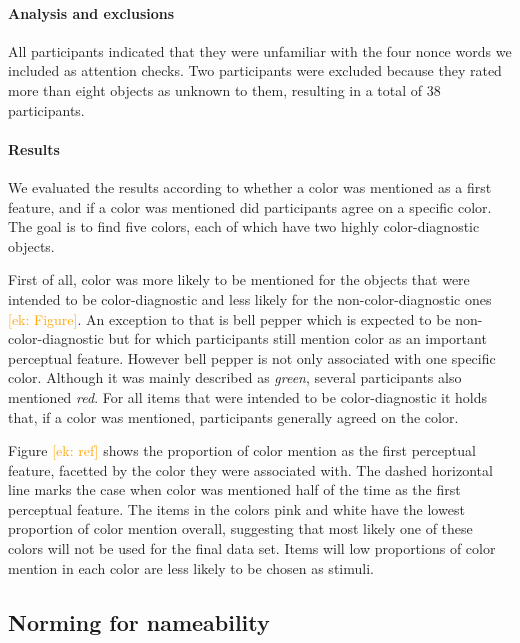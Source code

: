 \documentclass[a4paper,man,floatsintext,natbib,donotrepeattitle]{apa6}
\newcommand{\ek}[1]{\textcolor{Orange}{[ek: #1]}}
\begin{document}
\paragraph{Analysis and exclusions}
All participants indicated that they were unfamiliar with the four nonce words we included as attention checks. Two participants were excluded because they rated more than eight objects as unknown to them, resulting in a total of 38 participants.

\paragraph{Results}
We evaluated the results according to whether a color was mentioned as a first feature, and if a color was mentioned did participants agree on a specific color. The goal is to find five colors, each of which have two highly color-diagnostic objects.

First of all, color was more likely to be mentioned for the objects that were intended to be color-diagnostic and less likely for the non-color-diagnostic ones \ek{Figure}. An exception to that is bell pepper which is expected to be non-color-diagnostic but for which participants still mention color as an important perceptual feature. However bell pepper is not only associated with one specific color. Although it was mainly described as \textit{green}, several participants also mentioned \textit{red}. For all items that were intended to be color-diagnostic it holds that, if a color was mentioned, participants generally agreed on the color. 

Figure \ek{ref} shows the proportion of color mention as the first perceptual feature, facetted by the color they were associated with. The dashed horizontal line marks the case when color was mentioned half of the time as the first perceptual feature. The items in the colors pink and white have the lowest proportion of color mention overall, suggesting that most likely one of these colors will not be used for the final data set. Items will low proportions of color mention in each color are less likely to be chosen as stimuli. 


\subsection{Norming for nameability}
\label{nameabilitynorming}

\end{document}
